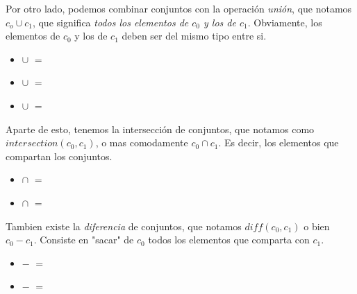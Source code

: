 \documentclass{article}
\begin{document}
Por otro lado, podemos combinar conjuntos con la operación \textit{unión}, que notamos $c_{o} \cup c_{1}$, que significa \textit{todos los elementos de $c_{0}$ y los de $c_{1}$}. Obviamente, los elementos de $c_{0}$ y los de $c_{1}$ deben ser del mismo tipo entre si.

\begin{multicols}{2}
\begin{center}
	\begin{itemize}
	
		\item[]  $\cup$  $=$ 
		\item[]  $\cup$ \set{} $=$ 
		\item[] \set{} $\cup$ \set{} $=$ \set{}
		
	\end{itemize}
\end{center}
\end{multicols}

Aparte de esto, tenemos la intersección de conjuntos, que notamos como $intersection(c_{0}, c_{1})$, o mas comodamente $c_{0} \cap c_{1}$. Es decir, los elementos que compartan los conjuntos.

\begin{multicols}{2}
\begin{center}
	\begin{itemize}
	
		\item[]  $\cap$  $=$ \set{2}
		\item[]  $\cap$ \set{} $=$ \set{}
		
	\end{itemize}
\end{center}
\end{multicols}

Tambien existe la \textit{diferencia} de conjuntos, que notamos $diff(c_{0}, c_{1})$ o bien $c_{0} - c_{1}$. Consiste en "sacar" de $c_{0}$ todos los elementos que comparta con $c_{1}$.

\begin{multicols}{2}
\begin{center}
	\begin{itemize}
	
		\item[]  $-$  $=$ \set{1}
		\item[]  $-$ \set{} $=$ 
		
	\end{itemize}
\end{center}
\end{multicols}
\end{document}
